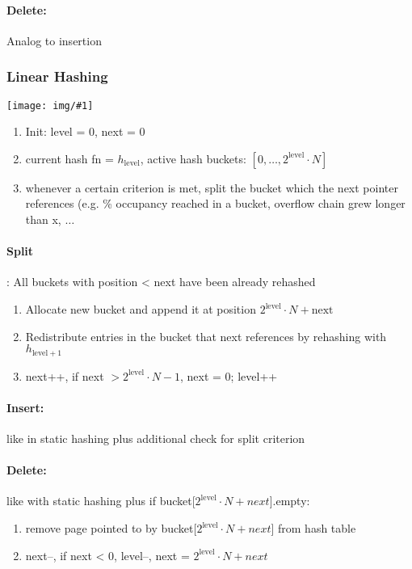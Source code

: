 \documentclass[a4paper]{article}
\newcommand{\img}[1]{\begin{center}
    \texttt{[image: img/\#1]}
\end{center} }
\begin{document}
\begin{twocolumn}
\paragraph{Delete:} Analog to insertion

\subsubsection{Linear Hashing}
\img{linear_hashing.png}
\begin{enumerate}
	\item Init: level = 0, next = 0
	\item current hash fn = $h_{\text{level}}$, active hash buckets: $[0,\dots, 2^{\text{level}} \cdot N]$
	\item whenever a certain criterion is met, split the bucket which the next pointer references (e.g. \% occupancy reached in a bucket, overflow chain grew longer than x, $\dots$
\end{enumerate}

\paragraph{Split}: All buckets with position < next have been already rehashed \\
\begin{enumerate}
	\item Allocate new bucket and append it at position $2^{\text{level}} \cdot N + \text{next}$
	\item Redistribute entries in the bucket that next references by rehashing with $h_{\text{level}+1}$
	\item next++, if next $> 2^{\text{level}} \cdot N - 1$, next = 0; level++
\end{enumerate}

\paragraph{Insert:} like in static hashing plus additional check for split criterion \\

\paragraph{Delete:} like with static hashing plus if bucket[$2^{\text{level}} \cdot N + next$].empty:
\begin{enumerate}
	\item remove page pointed to by bucket[$2^{\text{level}} \cdot N + next$] from hash table 
	\item next--, if next < 0, level--, next = $2^{\text{level}} \cdot N + next$
\end{enumerate}






\end{twocolumn}
\end{document}
